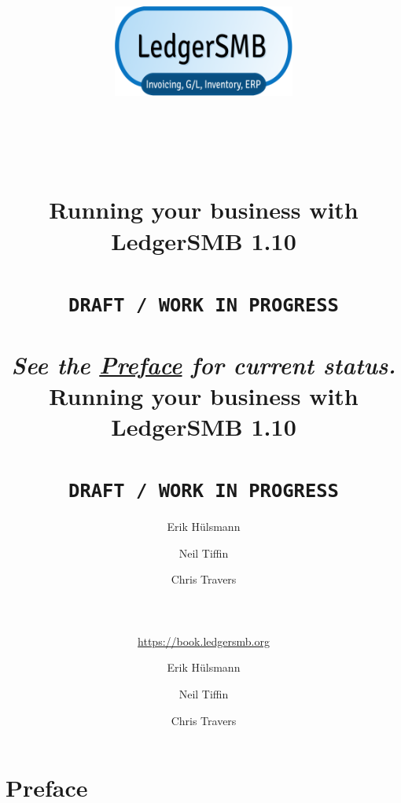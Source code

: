 \documentclass[10pt,a4paper]{book}
\newcommand{\ledgerSMBversion}{1.10 }
\begin{document}
\ifpdf
    \author{Erik H\"ulsmann \and Neil Tiffin \and Chris Travers \\
    ~ \\
    ~ \\
    ~ \\
     \url{https://book.ledgersmb.org}
    } 
    
    \title{
        \includegraphics[width=0.45\textwidth]{NewLedgerSMBLogo512x256.png}\\
        ~ \\
        ~ \\
        ~ \\
        Running your business with\\
        {\Huge LedgerSMB \ledgerSMBversion} \\
        ~ \\
        \texttt{DRAFT / WORK IN PROGRESS} \\
        ~ \\
        \normalsize{\emph{See the \hyperref[preface]{Preface}  for current status.}}\\
    }
    \maketitle

\else

    \author{Erik H\"ulsmann \and Neil Tiffin \and Chris Travers}
    \title{
        Running your business with
        LedgerSMB \ledgerSMBversion \\
        ~ \\
        \texttt{DRAFT / WORK IN PROGRESS} \\
    }

    \maketitle

\fi

\tableofcontents

\listoffigures

\listoftables

\cleardoublepage

\section*{Preface}
\label{preface}
\end{document}
